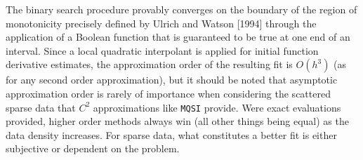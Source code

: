 The binary search procedure provably converges on the boundary of the
region of monotonicity precisely defined by Ulrich and Watson [1994]
through the application of a Boolean function that is guaranteed to be
true at one end of an interval. Since a local quadratic interpolant is
applied for initial function derivative estimates, the approximation
order of the resulting fit is $O(h^3)$ (as for any second order
approximation), but it should be noted that asymptotic approximation
order is rarely of importance when considering the scattered sparse
data that $C^2$ approximations like {\tt MQSI} provide. Were exact
evaluations provided, higher order methods always win (all
other things being equal) as the data density increases. For sparse
data, what constitutes a better fit is either subjective or dependent
on the problem.
